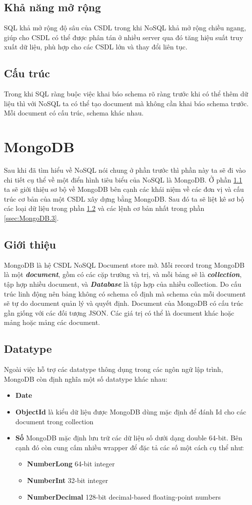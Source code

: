 \subsection{Khả năng mở rộng}
SQL khả mở rộng độ sâu của CSDL trong khi NoSQL khả mở rộng chiều ngang, giúp cho CSDL có thể được phân tán ở nhiều server qua đó tăng hiệu suất truy xuất dữ liệu, phù hợp cho các CSDL lớn và thay đổi liên tục.
\subsection{Cấu trúc}
Trong khi SQL ràng buộc việc khai báo schema rõ ràng trước khi có thể thêm dữ liệu thì với NoSQL ta có thể tạo document mà không cần khai báo schema trước. Mỗi document có cấu trúc, schema khác nhau.
\newpage
\section{MongoDB} \label{sec:MongoDB}
Sau khi đã tìm hiểu về NoSQL nói chung ở phần trước thì phần này ta sẽ đi vào chi tiết cụ thể về một điển hình tiêu biểu của NoSQL là MongoDB. Ở phần \ref{ssec:MongoDB.1} ta sẽ giới thiệu sơ bộ về MongoDB bên cạnh các khái niệm về các đơn vị và cấu trúc cơ bản của một CSDL xây dựng bằng MongoDB. Sau đó ta sẽ liệt kê sơ bộ các loại dữ liệu trong phần \ref{ssec:MongoDB.2} và các lệnh cơ bản nhất trong phần \ref{ssec:MongoDB.3}.
\subsection{Giới thiệu} \label{ssec:MongoDB.1}
MongoDB là hệ CSDL NoSQL Document store mở. Mỗi record trong MongoDB là một \textbf{\textit{document}}, gồm có các cặp trường và trị, và mỗi bảng sẽ là \textbf{\textit{collection}}, tập hợp nhiều document, và \textbf{\textit{Database}} là tập hợp của nhiều collection. Do cấu trúc linh động nên bảng không có schema cố định mà schema của mỗi document sẽ tự do document quản lý và quyết định. Document của MongoDB có cấu trúc gần giống với các đối tượng JSON. Các giá trị có thể là document khác hoặc mảng hoặc mảng các document.
\subsection{Datatype} \label{ssec:MongoDB.2}
Ngoài việc hỗ trợ các datatype thông dụng trong các ngôn ngữ lập trình, MongoDB còn định nghĩa một số datatype khác nhau:
\begin{itemize}
\item \textbf{Date}
\item \textbf{ObjectId} là kiểu dữ liệu được MongoDB dùng mặc định để đánh Id cho các document trong collection
\item \textbf{Số} MongoDB mặc định lưu trữ các dữ liệu số dưới dạng double 64-bit. Bên cạnh đó còn cung cấm nhiều wrapper để đặc tả các số một cách cụ thể như:
\begin{itemize}
\item \textbf{NumberLong} 64-bit integer
\item \textbf{NumberInt} 32-bit integer
\item \textbf{NumberDecimal} 128-bit decimal-based floating-point numbers
\end{itemize}
\end{itemize}
